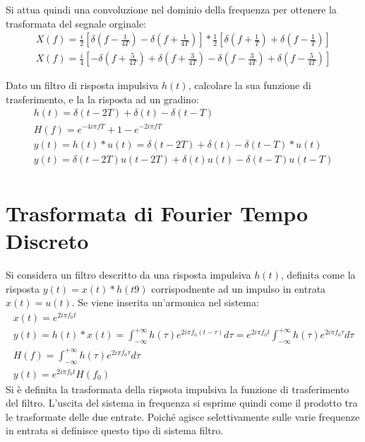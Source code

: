 \documentclass{article}
\numberwithin{equation}{subsection}
\begin{document}
Si attua quindi una convoluzione nel dominio della frequenza per ottenere la trasformata del segnale orginale:
\begin{gather*}
    X(f)=\displaystyle\frac{i}{2}\left[\delta\left(f-\frac{1}{4T}\right)-\delta\left(f+\frac{1}{4T}\right)\right]*\frac{1}{2}\left[\delta\left(f+\frac{1}{T}\right)+\delta\left(f-\frac{1}{T}\right)\right]\\
    X(f)=\displaystyle\frac{i}{4}\left[-\delta\left(f+\frac{5}{4T}\right)+\delta\left(f+\frac{3}{4T}\right)-\delta\left(f-\frac{3}{4T}\right)+\delta\left(f-\frac{5}{4T}\right)\right]
\end{gather*}

Dato un filtro di risposta impulsiva $h(t)$, calcolare la sua funzione di trasferimento, e la la risposta ad un gradino:
\begin{gather*}
    h(t)=\delta(t-2T)+\delta(t)-\delta(t-T)\\
    H(f)=e^{-4i\pi fT}+1-e^{-2i\pi fT}\\
    y(t)=h(t)*u(t)=\delta(t-2T)+\delta(t)-\delta(t-T)*u(t)\\
    y(t)=\delta(t-2T)u(t-2T)+\delta(t)u(t)-\delta(t-T)u(t-T)\\
\end{gather*}
\begin{center}
\end{center}

\clearpage

\section{Trasformata di Fourier Tempo Discreto}

Si considera un filtro descritto da una risposta impulsiva $h(t)$, definita come la risposta $y(t)=x(t)*h(t9)$ corrispodnente ad un impulso in entrata $x(t)=u(t)$. Se viene 
inserita un'armonica nel sistema:
\begin{gather*}
    x(t)=e^{2i\pi f_0t}\\
    y(t)=h(t)*x(t)=\displaystyle\int_{-\infty}^{+\infty}h(\tau)e^{2i\pi f_0(t-\tau)}d\tau=e^{2i\pi f_0t}\int_{-\infty}^{+\infty}h(\tau)e^{2i\pi f_0\tau}d\tau\\
    H(f)=\displaystyle\int_{-\infty}^{+\infty}h(\tau)e^{2i\pi f_0\tau}d\tau\\
    y(t)=e^{2i\pi f_0t}H(f_0)
\end{gather*}
Si è definita la trasformata della rispsota impulsiva la funzione di trasferimento del filtro. L'uscita del sistema in frequenza si esprime quindi come il prodotto 
tra le trasformate delle due entrate. Poiché agisce selettivamente sulle varie frequenze in entrata si definisce questo tipo di sistema filtro. 
\end{document}

